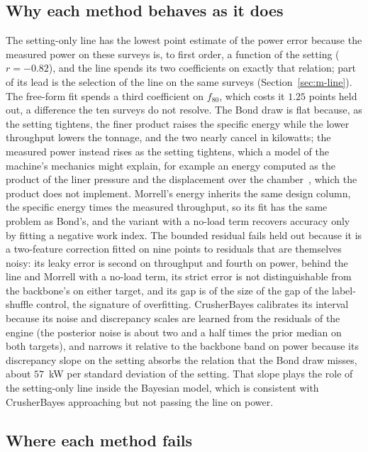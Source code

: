 \subsection{Why each method behaves as it does}\label{sec:disc-why}

The setting-only line has the lowest point estimate of the power error because the measured power on these surveys is, to first order, a function of the setting
($r=-0.82$), and the line spends its two coefficients on exactly that relation; part of its lead is the selection of the line on the same
surveys (Section~\ref{sec:m-line}). The free-form fit spends a third coefficient on $f_{80}$, which costs it $1.25$ points held out, a
difference the ten surveys do not resolve. The Bond draw is flat because, as the setting tightens, the finer product raises the specific energy
while the lower throughput lowers the tonnage, and the two nearly cancel in kilowatts; the measured power instead rises as the setting tightens,
which a model of the machine's mechanics might explain, for example an energy computed as the product of the liner pressure and
the displacement over the chamber~\cite{liu2018}, which the product does not implement. Morrell's energy inherits the same design column, the specific energy times the measured throughput,
so its fit has the same problem as Bond's, and the variant with a no-load term recovers accuracy only by fitting a negative work index. The bounded
residual fails held out because it is a two-feature correction fitted on nine points to residuals that are themselves noisy: its leaky error is
second on throughput and fourth on power, behind the line and Morrell with a no-load term, its strict error is not distinguishable from the
backbone's on either target, and its gap is of the size of the gap of the
label-shuffle control, the signature of overfitting. CrusherBayes calibrates its interval because
its noise and discrepancy scales are learned from the residuals of the engine (the posterior noise is about two and a half times the prior median on
both targets), and narrows it relative to the backbone band on power because its discrepancy slope on the setting absorbs the relation that the
Bond draw misses, about $57$~kW per standard deviation of the setting. That slope plays the role of the setting-only line inside the Bayesian model, which is
consistent with CrusherBayes approaching but not passing the line on power.

\subsection{Where each method fails}\label{sec:disc-failures}


